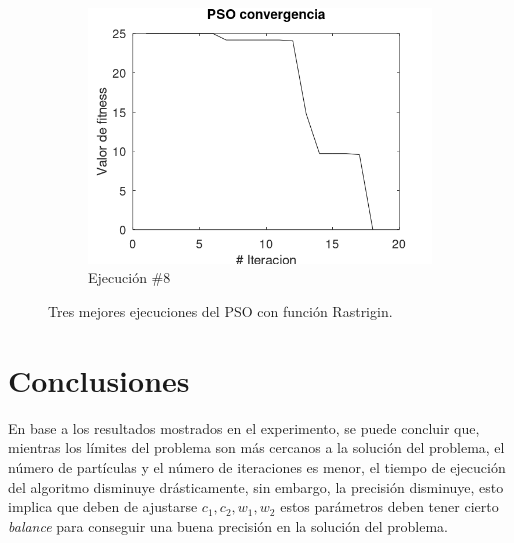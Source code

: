 \documentclass[12pt, a4paper]{article}
\begin{document}
\begin{figure}[H]
\begin{subfigure}[b]{0.3\textwidth}
             \end{subfigure}
             \hfill
             \begin{subfigure}[b]{0.3\textwidth}
                 \centering
                 \includegraphics[width=\textwidth]{img/pso6.png}
                 \caption{Ejecución \#8}
                 \label{fig:pso6}
             \end{subfigure}
                \caption{Tres mejores ejecuciones del PSO con función Rastrigin.}
                \label{fig:psobest3}
        \end{figure}
        
    \section{Conclusiones}
        En base a los resultados mostrados en el experimento, se puede concluir que, mientras los límites del problema son más cercanos a la solución del problema, el número de partículas y el número de iteraciones es menor, el tiempo de ejecución del algoritmo disminuye drásticamente, sin embargo, la precisión disminuye, esto implica que deben de ajustarse \(c_1, c_2, w_1, w_2\) estos parámetros deben tener cierto \emph{balance} para conseguir una buena precisión en la solución del problema.

    
    
    \nocite{*}
    
\end{document}
